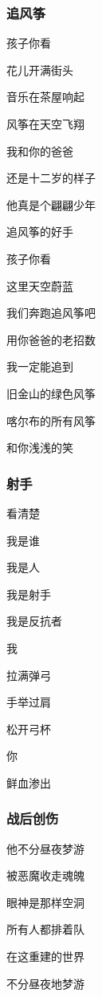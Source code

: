 \documentclass[openany,scheme = chinese, linespread = 1.5]{ctexbook}
\begin{document}
\subsubsection*{追风筝}

\begin{center}
孩子你看

花儿开满街头

音乐在茶屋响起

风筝在天空飞翔

我和你的爸爸

还是十二岁的样子

他真是个翩翩少年

追风筝的好手

孩子你看

这里天空蔚蓝

我们奔跑追风筝吧

用你爸爸的老招数

我一定能追到

旧金山的绿色风筝

喀尔布的所有风筝

和你浅浅的笑
\end{center}  

\subsubsection*{射手}

\begin{center}
看清楚

我是谁

我是人

我是射手

我是反抗者

我

拉满弹弓

手举过肩

松开弓杯

你

鲜血渗出
\end{center}

\subsubsection*{战后创伤}

\begin{center}
他不分昼夜梦游

被恶魔收走魂魄

眼神是那样空洞

所有人都排着队

在这重建的世界

不分昼夜地梦游
\end{center}
\end{document}
